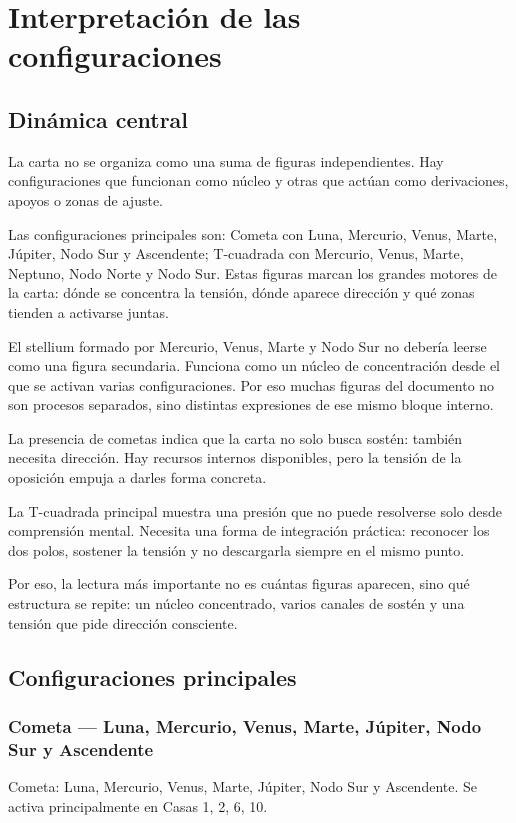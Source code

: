 \documentclass[11pt,a4paper]{article}
\begin{document}
\section{Interpretación de las configuraciones}

\subsection*{Dinámica central}
La carta no se organiza como una suma de figuras independientes. Hay configuraciones que funcionan como núcleo y otras que actúan como derivaciones, apoyos o zonas de ajuste.

Las configuraciones principales son: Cometa con Luna, Mercurio, Venus, Marte, Júpiter, Nodo Sur y Ascendente; T-cuadrada con Mercurio, Venus, Marte, Neptuno, Nodo Norte y Nodo Sur. Estas figuras marcan los grandes motores de la carta: dónde se concentra la tensión, dónde aparece dirección y qué zonas tienden a activarse juntas.

El stellium formado por Mercurio, Venus, Marte y Nodo Sur no debería leerse como una figura secundaria. Funciona como un núcleo de concentración desde el que se activan varias configuraciones. Por eso muchas figuras del documento no son procesos separados, sino distintas expresiones de ese mismo bloque interno.

La presencia de cometas indica que la carta no solo busca sostén: también necesita dirección. Hay recursos internos disponibles, pero la tensión de la oposición empuja a darles forma concreta.

La T-cuadrada principal muestra una presión que no puede resolverse solo desde comprensión mental. Necesita una forma de integración práctica: reconocer los dos polos, sostener la tensión y no descargarla siempre en el mismo punto.

Por eso, la lectura más importante no es cuántas figuras aparecen, sino qué estructura se repite: un núcleo concentrado, varios canales de sostén y una tensión que pide dirección consciente.

\subsection*{Configuraciones principales}

\subsubsection*{Cometa — Luna, Mercurio, Venus, Marte, Júpiter, Nodo Sur y Ascendente}
Cometa: Luna, Mercurio, Venus, Marte, Júpiter, Nodo Sur y Ascendente. Se activa principalmente en Casas 1, 2, 6, 10.
\end{document}
